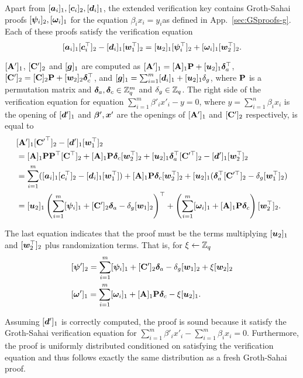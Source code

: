 Apart from $[{\boldsymbol{a}}_i]_1,[{\boldsymbol{c}}_i]_2,[{\boldsymbol{d}}_i]_1$, the extended verification key contains Groth-Sahai proofs $[{\boldsymbol{\psi}}_i]_2,[{\boldsymbol{\omega}}_i]_1$ for the equation $\beta_ix_i = y_i$\ifPKC\else as defined in App.~\ref{sec:GSproofs-g}\fi. Each of these proofs satisfy the verification equation
$$
[{\boldsymbol{a}}_i]_1[{\boldsymbol{c}}_i^\top]_2 - [{\boldsymbol{d}}_i]_1[{\boldsymbol{w}}_1^\top]_2 = [{\boldsymbol{u}}_2]_1[{\boldsymbol{\psi}}^\top_i]_2 + [{\boldsymbol{\omega}}_i]_1[{\boldsymbol{w}}_2^\top]_2.
$$

$[\mathbf{{A}}']_1$, $[\mathbf{{C}}']_2$ and $[{\boldsymbol{g}}]_1$ are computed as $[\mathbf{{A}}']_1 = [\mathbf{{A}}]_1\mathbf{{P}}+[{\boldsymbol{u}}_2]_1{\boldsymbol{\delta}}_a^\top$, $[\mathbf{{C}}']_2 = [\mathbf{{C}}]_2\mathbf{{P}}+[{\boldsymbol{w}}_2]_2{\boldsymbol{\delta}}_c^\top$, and $[{\boldsymbol{g}}]_1 = \sum_{i=1}^m [{\boldsymbol{d}}_i]_1 + [{\boldsymbol{u}}_2]_1\delta_g$, where $\mathbf{{P}}$ is a permutation matrix and ${\boldsymbol{\delta}}_a,{\boldsymbol{\delta}}_c\in\mathbb{Z}_q^m$ and $\delta_g\in\mathbb{Z}_q$.
The right side of the verification equation for equation $\sum_{i=1}^m\beta'_i x'_i - y = 0$, where $y=\sum_{i=1}^n \beta_ix_i$ is the opening of $[{\boldsymbol{d}}']_1$ and ${\boldsymbol{\beta}}',{\boldsymbol{x}}'$ are the openings of $[\mathbf{{A}}']_1$ and $[\mathbf{{C}}']_2$ respectively, is equal to
\begin{align*}
&[\mathbf{{A}}']_1[{\mathbf{{C}}'}^\top]_2 - [{\boldsymbol{d}}']_1[{\boldsymbol{w}}_1^\top]_2\\
&= [\mathbf{{A}}]_1\mathbf{{P}}\mathbf{{P}}^\top[\mathbf{{C}}^\top]_2 + [\mathbf{{A}}]_1\mathbf{{P}}{\boldsymbol{\delta}}_c[{\boldsymbol{w}}_2^\top]_2 + [{\boldsymbol{u}}_2]_1{\boldsymbol{\delta}}_a^\top[\mathbf{{C}}'^\top]_2-[{\boldsymbol{d}}']_1[{\boldsymbol{w}}_2^\top]_2\\
&=\sum_{i=1}^m ([{\boldsymbol{a}}_i]_1[{\boldsymbol{c}}_i^\top]_2-[{\boldsymbol{d}}_i]_1[{\boldsymbol{w}}_1^\top]) +[\mathbf{{A}}]_1\mathbf{{P}}{\boldsymbol{\delta}}_c[{\boldsymbol{w}}_2^\top]_2 + [{\boldsymbol{u}}_2]_1({\boldsymbol{\delta}}_a^\top[\mathbf{{C}}'^\top]_2-\delta_g[{\boldsymbol{w}}_1^\top]_2)\\
&= [{\boldsymbol{u}}_2]_1\left(\sum_{i=1}^m[{\boldsymbol{\psi}}_i]_1+[\mathbf{{C}}']_2{\boldsymbol{\delta}}_a-\delta_g[{\boldsymbol{w}}_1]_2\right)^\top + \left(\sum_{i=1}^m[{\boldsymbol{\omega}}_i]_1+[\mathbf{{A}}]_1\mathbf{{P}}{\boldsymbol{\delta}}_c\right)[{\boldsymbol{w}}_2^\top]_2.
\end{align*}

The last equation indicates that the proof must be the terms multiplying $[{\boldsymbol{u}}_2]_1$ and $[{\boldsymbol{w}}_2^\top]_2$ plus randomization terms. That is, for $\xi\gets\mathbb{Z}_q$
\begin{align}
&[{\boldsymbol{\psi}}']_2 = \sum_{i=1}^m[{\boldsymbol{\psi}}_i]_1+[\mathbf{{C}}']_2{\boldsymbol{\delta}}_a-\delta_g[{\boldsymbol{w}}_1]_2 + \xi[{\boldsymbol{w}}_2]_2\nonumber\\
&
[{\boldsymbol{\omega}}']_1 = \sum_{i=1}^m[{\boldsymbol{\omega}}_i]_1+[\mathbf{{A}}]_1\mathbf{{P}}{\boldsymbol{\delta}}_c - \xi[{\boldsymbol{u}}_2]_1.\label{eq:rerand-proofs-g}
\end{align}

Assuming $[{\boldsymbol{d}}']_1$ is correctly computed, the proof is sound because it satisfy the Groth-Sahai verification equation for $\sum_{i=1}^m \beta'_ix'_i - \sum_{i=1}^m \beta_i x_i=0$. Furthermore, the proof is uniformly distributed conditioned on satisfying the verification equation and thus follows exactly the same distribution as a fresh Groth-Sahai proof.